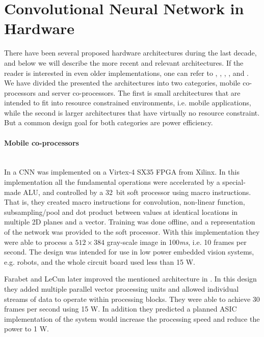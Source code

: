 \section{Convolutional Neural Network in Hardware} \label{sec_related_work_cnn}

There have been several proposed hardware architectures during the last decade, and below we will describe the more recent and relevant architectures. If the reader is interested in even older implementations, one can refer to \cite{Girones1999}, \cite{Benkrid2002}, \cite{Cardells-Tormo2005}, \cite{Zhang2007}, and \cite{Savich2007}. We have divided the presented the architectures into two categories, mobile co-processors and server co-processors. The first is small architectures that are intended to fit into resource constrained environments, i.e. mobile applications, while the second is larger architectures that have virtually no resource constraint. But a common design goal for both categories are power efficiency. 

\paragraph{Mobile co-processors} \hfil \\
In \cite{Farabet2009} a CNN was implemented on a Virtex-4 SX35 FPGA from Xilinx. In this implementation all the fundamental operations were accelerated by a special-made ALU, and controlled by a 32~bit soft processor using macro instructions. That is, they created macro instructions for convolution, non-linear function, subsampling/pool and dot product between values at identical locations in multiple 2D planes and a vector. Training was done offline, and a representation of the network was provided to the soft processor. With this implementation they were able to process a $ 512 \times 384 $ gray-scale image in 100\textit{ms}, i.e. 10 frames per second. The design was intended for use in low power embedded vision  systems, e.g. robots, and the whole circuit board used less than 15 W.

Farabet and LeCun later improved the mentioned architecture in \cite{Farabet2010}. In this design they added multiple parallel vector processing units and allowed individual
streams of data to operate within processing blocks. They were able to achieve 30 frames per second using 15 W. In addition they predicted a planned ASIC implementation of the system would increase the processing speed and reduce the power to 1 W. 

